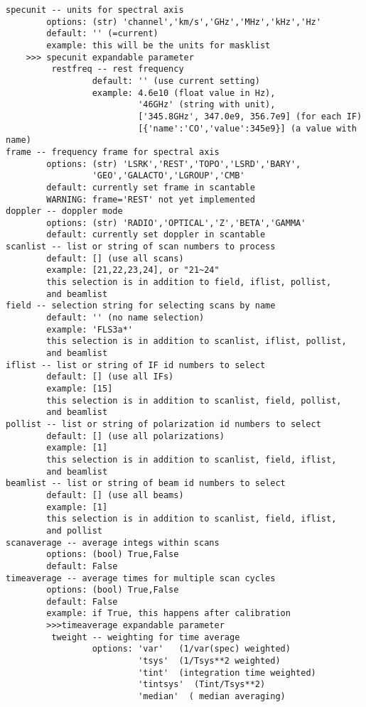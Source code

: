 \begin{verbatim}
specunit -- units for spectral axis
        options: (str) 'channel','km/s','GHz','MHz','kHz','Hz'
        default: '' (=current)
        example: this will be the units for masklist
    >>> specunit expandable parameter
         restfreq -- rest frequency
                 default: '' (use current setting)
                 example: 4.6e10 (float value in Hz),
                          '46GHz' (string with unit),
                          ['345.8GHz', 347.0e9, 356.7e9] (for each IF)
                          [{'name':'CO','value':345e9}] (a value with name)
frame -- frequency frame for spectral axis
        options: (str) 'LSRK','REST','TOPO','LSRD','BARY',
                 'GEO','GALACTO','LGROUP','CMB'
        default: currently set frame in scantable
        WARNING: frame='REST' not yet implemented
doppler -- doppler mode
        options: (str) 'RADIO','OPTICAL','Z','BETA','GAMMA'
        default: currently set doppler in scantable
scanlist -- list or string of scan numbers to process
        default: [] (use all scans)
        example: [21,22,23,24], or "21~24"
        this selection is in addition to field, iflist, pollist,
        and beamlist
field -- selection string for selecting scans by name
        default: '' (no name selection)
        example: 'FLS3a*'
        this selection is in addition to scanlist, iflist, pollist,
        and beamlist
iflist -- list or string of IF id numbers to select
        default: [] (use all IFs)
        example: [15]
        this selection is in addition to scanlist, field, pollist,
        and beamlist
pollist -- list or string of polarization id numbers to select
        default: [] (use all polarizations)
        example: [1]
        this selection is in addition to scanlist, field, iflist,
        and beamlist
beamlist -- list or string of beam id numbers to select
        default: [] (use all beams)
        example: [1]
        this selection is in addition to scanlist, field, iflist,
        and pollist
scanaverage -- average integs within scans
        options: (bool) True,False
        default: False
timeaverage -- average times for multiple scan cycles
        options: (bool) True,False
        default: False
        example: if True, this happens after calibration
        >>>timeaverage expandable parameter
         tweight -- weighting for time average
                 options: 'var'   (1/var(spec) weighted)
                          'tsys'  (1/Tsys**2 weighted)
                          'tint'  (integration time weighted)
                          'tintsys'  (Tint/Tsys**2)
                          'median'  ( median averaging)

\end{verbatim}
